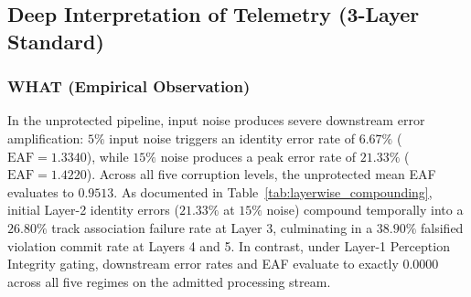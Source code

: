 \documentclass[conference]{IEEEtran}
\begin{document}
\begin{table}[t]
\centering
\caption{Layer-Wise Error Compounding Dynamics (Unprotected Pipeline)}
\label{tab:layerwise_compounding}
\end{table}

\subsection{Deep Interpretation of Telemetry (3-Layer Standard)}
\subsubsection{WHAT (Empirical Observation)}
In the unprotected pipeline, input noise produces severe downstream error amplification: $5\%$ input noise triggers an identity error rate of $6.67\%$ ($\text{EAF} = 1.3340$), while $15\%$ noise produces a peak error rate of $21.33\%$ ($\text{EAF} = 1.4220$). Across all five corruption levels, the unprotected mean EAF evaluates to $0.9513$. As documented in Table~\ref{tab:layerwise_compounding}, initial Layer-2 identity errors ($21.33\%$ at $15\%$ noise) compound temporally into a $26.80\%$ track association failure rate at Layer 3, culminating in a $38.90\%$ falsified violation commit rate at Layers 4 and 5. In contrast, under Layer-1 Perception Integrity gating, downstream error rates and EAF evaluate to exactly $0.0000$ across all five regimes on the admitted processing stream.
\end{document}

